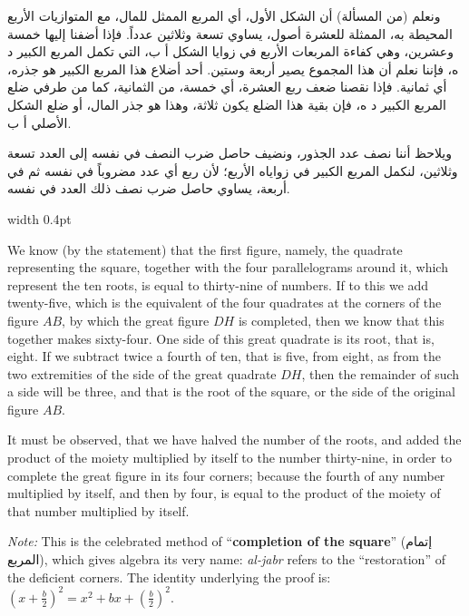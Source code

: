 \documentclass[11pt,a4paper]{book}
\newcommand{\cnote}[1]{\textcolor{notecolor}{\textit{#1}}}
\newcommand{\ar}[1]{{\arabicfont\beginR #1\endR}}
\begin{document}
\noindent\begin{minipage}[t]{0.48\textwidth}
\raggedleft

\begin{Arabic}
ونعلم (من المسألة) أن الشكل الأول، أي المربع الممثل للمال، مع المتوازيات الأربع المحيطة به، الممثلة للعشرة أصول، يساوي تسعة وثلاثين عدداً. فإذا أضفنا إليها خمسة وعشرين، وهي كفاءة المربعات الأربع في زوايا الشكل أ ب، التي تكمل المربع الكبير د ه، فإننا نعلم أن هذا المجموع يصير أربعة وستين. أحد أضلاع هذا المربع الكبير هو جذره، أي ثمانية. فإذا نقصنا ضعف ربع العشرة، أي خمسة، من الثمانية، كما من طرفي ضلع المربع الكبير د ه، فإن بقية هذا الضلع يكون ثلاثة، وهذا هو جذر المال، أو ضلع الشكل الأصلي أ ب.

ويلاحظ أننا نصف عدد الجذور، ونضيف حاصل ضرب النصف في نفسه إلى العدد تسعة وثلاثين، لنكمل المربع الكبير في زواياه الأربع؛ لأن ربع أي عدد مضروباً في نفسه ثم في أربعة، يساوي حاصل ضرب نصف ذلك العدد في نفسه.
\end{Arabic}

\end{minipage}%
\hfill\vrule width 0.4pt\hfill
\begin{minipage}[t]{0.48\textwidth}
\raggedright

We know (by the statement) that the first figure, namely, the quadrate representing the square, together with the four parallelograms around it, which represent the ten roots, is equal to thirty-nine of numbers. If to this we add twenty-five, which is the equivalent of the four quadrates at the corners of the figure $AB$, by which the great figure $DH$ is completed, then we know that this together makes sixty-four. One side of this great quadrate is its root, that is, eight. If we subtract twice a fourth of ten, that is five, from eight, as from the two extremities of the side of the great quadrate $DH$, then the remainder of such a side will be three, and that is the root of the square, or the side of the original figure $AB$.

\vspace{0.3cm}

It must be observed, that we have halved the number of the roots, and added the product of the moiety multiplied by itself to the number thirty-nine, in order to complete the great figure in its four corners; because the fourth of any number multiplied by itself, and then by four, is equal to the product of the moiety of that number multiplied by itself.

\cnote{Note:} This is the celebrated method of ``\textbf{completion of the square}'' (\ar{إتمام المربع}), which gives algebra its very name: \textit{al-jabr} refers to the ``restoration'' of the deficient corners. The identity underlying the proof is: $\left(x + \frac{b}{2}\right)^2 = x^2 + bx + \left(\frac{b}{2}\right)^2$.

\end{minipage}
\vspace{0.3cm}
\end{document}
